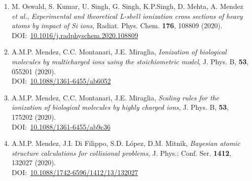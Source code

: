 \begin{enumerate}
\item
M. Oswald, S. Kumar, U. Singh, G. Singh, K.P.Singh, D. Mehta, A. Mendez 
\textit{et al.}, 
\textit{Experimental and theoretical L-shell ionization cross sections of heavy atoms by impact of Si ions},
Radiat. Phys. Chem.  \textbf{176}, 108809 (2020). \\
DOI:~\href{http://www.doi.org/10.1016/j.radphyschem.2020.108809}{10.1016/j.radphyschem.2020.108809}

\item
A.M.P. Mendez, C.C. Montanari, J.E. Miraglia,
\textit{Ionization of biological molecules by multicharged ions using the stoichiometric model},
J. Phys. B, \textbf{53}, 055201 (2020). \\
DOI:~\href{http://www.doi.org/10.1088/1361-6455/ab6052}{10.1088/1361-6455/ab6052}

\item
A.M.P. Mendez, C.C. Montanari, J.E. Miraglia,
\textit{Scaling rules for the ionization of biological molecules by highly charged ions},
J. Phys. B, \textbf{53}, 175202 (2020). \\
DOI:~\href{http://www.doi.org/10.1088/1361-6455/ab9c36}{10.1088/1361-6455/ab9c36}

\item
A.M.P. Mendez, J.I. Di Filippo, S.D. López, D.M. Mitnik,
\textit{Bayesian atomic structure calculations for collisional problems},
J. Phys.: Conf. Ser. \textbf{1412}, 132027 (2020). \\
DOI:~\href{http://www.doi.org/10.1088/1742-6596/1412/13/132027}{10.1088/1742-6596/1412/13/132027}

\end{enumerate}

